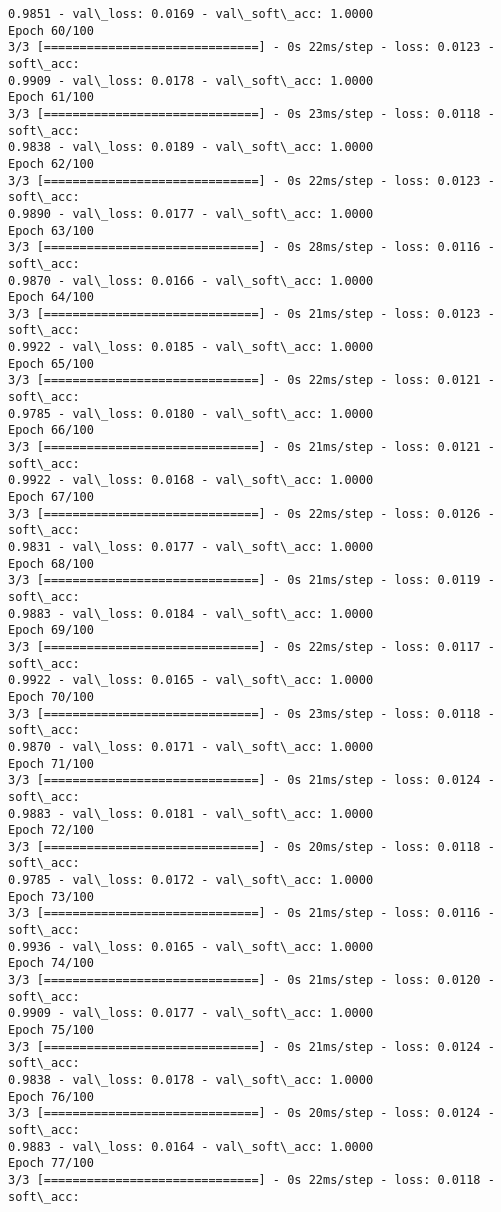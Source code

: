 \documentclass[11pt]{article}
\begin{document}
\begin{Verbatim}[commandchars=\\\{\}]
0.9851 - val\_loss: 0.0169 - val\_soft\_acc: 1.0000
Epoch 60/100
3/3 [==============================] - 0s 22ms/step - loss: 0.0123 - soft\_acc:
0.9909 - val\_loss: 0.0178 - val\_soft\_acc: 1.0000
Epoch 61/100
3/3 [==============================] - 0s 23ms/step - loss: 0.0118 - soft\_acc:
0.9838 - val\_loss: 0.0189 - val\_soft\_acc: 1.0000
Epoch 62/100
3/3 [==============================] - 0s 22ms/step - loss: 0.0123 - soft\_acc:
0.9890 - val\_loss: 0.0177 - val\_soft\_acc: 1.0000
Epoch 63/100
3/3 [==============================] - 0s 28ms/step - loss: 0.0116 - soft\_acc:
0.9870 - val\_loss: 0.0166 - val\_soft\_acc: 1.0000
Epoch 64/100
3/3 [==============================] - 0s 21ms/step - loss: 0.0123 - soft\_acc:
0.9922 - val\_loss: 0.0185 - val\_soft\_acc: 1.0000
Epoch 65/100
3/3 [==============================] - 0s 22ms/step - loss: 0.0121 - soft\_acc:
0.9785 - val\_loss: 0.0180 - val\_soft\_acc: 1.0000
Epoch 66/100
3/3 [==============================] - 0s 21ms/step - loss: 0.0121 - soft\_acc:
0.9922 - val\_loss: 0.0168 - val\_soft\_acc: 1.0000
Epoch 67/100
3/3 [==============================] - 0s 22ms/step - loss: 0.0126 - soft\_acc:
0.9831 - val\_loss: 0.0177 - val\_soft\_acc: 1.0000
Epoch 68/100
3/3 [==============================] - 0s 21ms/step - loss: 0.0119 - soft\_acc:
0.9883 - val\_loss: 0.0184 - val\_soft\_acc: 1.0000
Epoch 69/100
3/3 [==============================] - 0s 22ms/step - loss: 0.0117 - soft\_acc:
0.9922 - val\_loss: 0.0165 - val\_soft\_acc: 1.0000
Epoch 70/100
3/3 [==============================] - 0s 23ms/step - loss: 0.0118 - soft\_acc:
0.9870 - val\_loss: 0.0171 - val\_soft\_acc: 1.0000
Epoch 71/100
3/3 [==============================] - 0s 21ms/step - loss: 0.0124 - soft\_acc:
0.9883 - val\_loss: 0.0181 - val\_soft\_acc: 1.0000
Epoch 72/100
3/3 [==============================] - 0s 20ms/step - loss: 0.0118 - soft\_acc:
0.9785 - val\_loss: 0.0172 - val\_soft\_acc: 1.0000
Epoch 73/100
3/3 [==============================] - 0s 21ms/step - loss: 0.0116 - soft\_acc:
0.9936 - val\_loss: 0.0165 - val\_soft\_acc: 1.0000
Epoch 74/100
3/3 [==============================] - 0s 21ms/step - loss: 0.0120 - soft\_acc:
0.9909 - val\_loss: 0.0177 - val\_soft\_acc: 1.0000
Epoch 75/100
3/3 [==============================] - 0s 21ms/step - loss: 0.0124 - soft\_acc:
0.9838 - val\_loss: 0.0178 - val\_soft\_acc: 1.0000
Epoch 76/100
3/3 [==============================] - 0s 20ms/step - loss: 0.0124 - soft\_acc:
0.9883 - val\_loss: 0.0164 - val\_soft\_acc: 1.0000
Epoch 77/100
3/3 [==============================] - 0s 22ms/step - loss: 0.0118 - soft\_acc:

\end{Verbatim}
\end{document}
